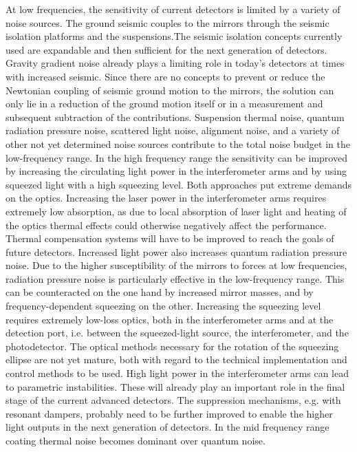 At low frequencies, the sensitivity of current detectors is limited by a variety of noise sources. The ground seismic couples to the mirrors through the seismic isolation platforms and the suspensions.The seismic isolation concepts currently used are expandable and then sufficient for the next generation of detectors. Gravity gradient noise already plays a limiting role in today's detectors at times with increased seismic. Since there are no concepts to prevent or reduce the Newtonian coupling of seismic ground motion to the mirrors, the solution can only lie in a reduction of the ground motion itself or in a measurement and subsequent subtraction of the contributions. Suspension thermal noise, quantum radiation pressure noise, scattered light noise, alignment noise, and a variety of other not yet determined noise sources contribute to the total noise budget in the low-frequency range.
In the high frequency range the sensitivity can be improved by increasing the circulating light power in the interferometer arms and by using squeezed light with a high squeezing level. Both approaches put extreme demands on the optics. Increasing the laser power in the interferometer arms requires extremely low absorption, as due to local absorption of laser light and heating of the optics thermal effects could otherwise negatively affect the performance. Thermal compensation systems will have to be improved to reach the goals of future detectors. Increased light power also increases quantum radiation pressure noise. Due to the higher susceptibility of the mirrors to forces at low frequencies, radiation pressure noise is particularly effective in the low-frequency range. This can be counteracted on the one hand by increased mirror masses, and by frequency-dependent squeezing on the other. Increasing the squeezing level requires extremely low-loss optics, both in the interferometer arms and at the detection port, i.e. between the squeezed-light source, the interferometer, and the photodetector. The optical methods necessary for the rotation of the squeezing ellipse are not yet mature, both with regard to the technical implementation and control methods to be used. High light power in the interferometer arms can lead to parametric instabilities. These will already play an important role in the final stage of the current advanced detectors. The suppression mechanisms, e.g. with resonant dampers, probably need to be further improved to enable the higher light outputs in the next generation of detectors.
In the mid frequency range coating thermal noise becomes dominant over quantum noise.